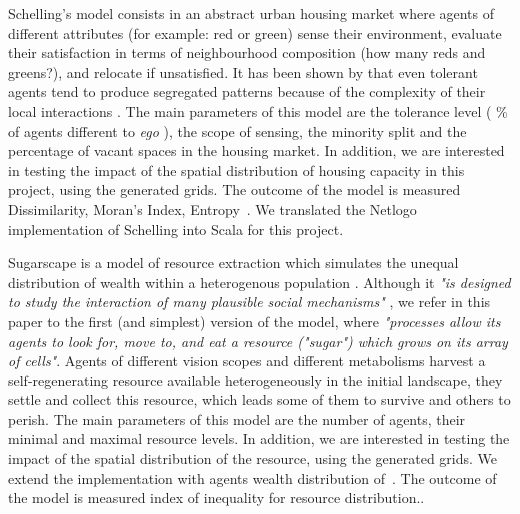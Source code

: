 \documentclass[3p,times,procedia]{elsarticle}
\begin{document}
Schelling's model consists in an abstract urban housing market where agents of different attributes (for example: red or green) sense their environment, evaluate their satisfaction in terms of neighbourhood composition (how many reds and greens?), and relocate if unsatisfied. It has been shown by \cite{Schelling1969} that even tolerant agents tend to produce segregated patterns because of the complexity of their local interactions . The main parameters of this model are the tolerance level ( \% of agents different to {\it ego} ), the scope of sensing, the minority split and the percentage of vacant spaces in the housing market. In addition, we are interested in testing the impact of the  spatial distribution of housing capacity in this project, using the generated grids. The outcome of the model is measured  Dissimilarity, Moran's Index, Entropy~\citep{brown2006spatial}. We translated the Netlogo implementation of Schelling into Scala for this project.

Sugarscape is a model of resource extraction which simulates the unequal distribution of wealth within a heterogenous population \citep{EpsteinAxtell1996}. Although it {\it "is designed to study the interaction of many plausible social mechanisms"} \citep[p.125]{Axtelletal1996}, we refer in this paper to the first (and simplest) version of the model, where {\it "processes allow its agents to look for, move to, and eat a resource ("sugar") which grows on its  array of cells"}. Agents of different vision scopes and different metabolisms harvest a self-regenerating resource available heterogeneously in the initial landscape, they settle and collect this resource, which leads some of them to survive and others to perish. The main parameters of this model are the number of agents, their minimal and maximal resource levels. In addition, we are interested in testing the impact of the spatial distribution of the resource, using the generated grids. We extend the implementation with agents wealth distribution of~\citet{li2009netlogo}. The outcome of the model is measured  index of inequality for resource distribution.. 
\end{document}
